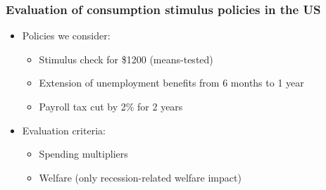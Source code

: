 \documentclass[pdflatex,aspectratio=169]{beamer}
\begin{document}
    \begin{frame}
      \frametitle{Evaluation of consumption stimulus policies in the US}
      \begin{itemize}[<+->]
        \itemsep = .5\bigskipamount 
      \item Policies we consider: 
        \begin{itemize}[<+->]
          \itemsep = .25\bigskipamount 
        \item Stimulus check for \$1200 (means-tested)
        \item Extension of unemployment benefits from 6 months to 1 year
        \item Payroll tax cut by 2\% for 2 years
        \end{itemize}
        \bigskip
      \item Evaluation criteria: 
        \begin{itemize}[<+->]
          \itemsep = .25\bigskipamount 
        \item Spending multipliers
        \item Welfare (only recession-related welfare impact)
        \end{itemize}
      \end{itemize}
    \end{frame}
\end{document}

